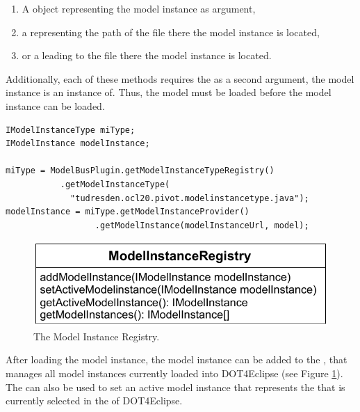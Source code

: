 \begin{enumerate}
	\item A  object representing the model instance as argument,
	\item a  representing the path of the file there the model instance is located,
	\item or a  leading to the file there the model instance is located.
\end{enumerate}

Additionally, each of these methods requires the  as a second argument, the model instance is an instance of. Thus, the model must be loaded before the model instance can be loaded.

\lstset{
  language=Java
}
\begin{lstlisting}[caption={How to load a model instance.}, captionpos=b, label=lst:integration:loadModelInstance, float]
IModelInstanceType miType;
IModelInstance modelInstance;

miType = ModelBusPlugin.getModelInstanceTypeRegistry()
           .getModelInstanceType(
             "tudresden.ocl20.pivot.modelinstancetype.java");
modelInstance = miType.getModelInstanceProvider()
                  .getModelInstance(modelInstanceUrl, model);
\end{lstlisting}

\begin{figure}[!b]
	\centering
	\includegraphics[width=.75\linewidth]{figures/integration/modelInstanceRegistry}
	\caption{The Model Instance Registry.}
	\label{pic:integration:modelInstanceRegistry}
\end{figure}

After loading the model instance, the model instance can be added to the , that manages all model instances currently loaded into \acl{DOT4Eclipse} (see Figure \ref{pic:integration:modelInstanceRegistry}). The  can also be used to set an active model instance that represents the  that is currently selected in the  of \acl{DOT4Eclipse}.



